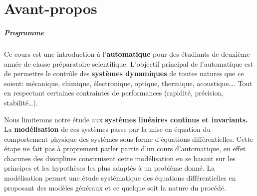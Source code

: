 \chapter*{Avant-propos}
\thispagestyle{plain}
\paragraph{Programme}
Ce cours est une introduction à l'\textbf{automatique}
pour des étudiants de deuxième année de classe préparatoire scientifique.
L'objectif principal de l'automatique est de permettre
le contrôle des \textbf{systèmes dynamiques}
de toutes natures que ce soient: mécanique, chimique, 
électronique, optique, thermique, acoustique\ldots.
Tout en respectant certaines contraintes de performances 
(rapidité, précision, stabilité\ldots).

Nous limiterons notre étude aux \textbf{systèmes linéaires continus et 
invariants.} La \textbf{modélisation} de ces systèmes passe par la mise 
en équation du comportement physique des systèmes sous forme d'équations 
différentielles. Cette étape ne fait pas à proprement parler partie d'un 
cours d'automatique, en effet chacunes des disciplines construisent cette 
modélisation en se basant sur les principes et les hypothèses les plus 
adaptés à un problème donné.
La modélisation permet une étude systématique des équations différentielles 
en proposant des modèles généraux et ce quelque soit la nature du procédé.

